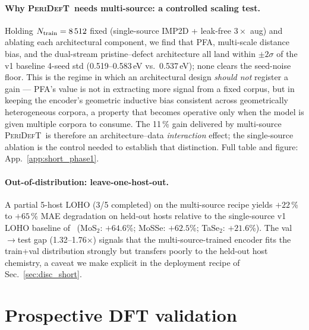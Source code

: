 \documentclass[11pt,a4paper]{article}
\newcommand{\modelname}{\textsc{PeriDefT}}
\begin{document}
\paragraph{Why \modelname\ needs multi-source: a controlled scaling test.}
\label{sec:phase1_short}
Holding $N_{\rm train}=8\,512$ fixed (single-source IMP2D + leak-free
$3\times$ aug) and ablating each architectural component, we find
that PFA, multi-scale distance bias, and the dual-stream
pristine--defect architecture all land within $\pm 2\sigma$ of the
v1 baseline 4-seed std (0.519--0.583\,eV vs.\ 0.537\,eV); none
clears the seed-noise floor. This is the regime in which an
architectural design \emph{should not} register a gain --- PFA's
value is not in extracting more signal from a fixed corpus, but in
keeping the encoder's geometric inductive bias consistent across
geometrically heterogeneous corpora, a property that becomes
operative only when the model is given multiple corpora to consume.
The 11\,\% gain delivered by multi-source \modelname\ is therefore
an architecture--data \emph{interaction} effect; the single-source
ablation is the control needed to establish that distinction. Full
table and figure: App.~\ref{app:short_phase1}.

\paragraph{Out-of-distribution: leave-one-host-out.}
A partial 5-host LOHO (3/5 completed) on the multi-source recipe
yields $+22$\,\% to $+65$\,\% MAE degradation on held-out hosts
relative to the single-source v1 LOHO baseline of~\cite{ourPaperV12}
(MoS$_2$: $+64.6$\%; MoSSe: $+62.5$\%; TaSe$_2$: $+21.6$\%). The
val$\to$test gap (1.32--1.76$\times$) signals that the
multi-source-trained encoder fits the train+val distribution
strongly but transfers poorly to the held-out host chemistry, a
caveat we make explicit in the deployment recipe of
Sec.~\ref{sec:disc_short}.

\section{Prospective DFT validation}\label{sec:prospective_short}
\end{document}
